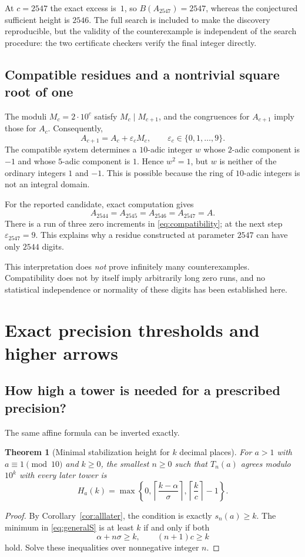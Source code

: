 \documentclass[11pt,a4paper]{article}
\newtheorem{theorem}{Theorem}[section]
\theoremstyle{definition}
\theoremstyle{remark}
\newcommand{\ceil}[1]{\left\lceil #1\right\rceil}
\begin{document}
At $c=2547$ the exact excess is~$1$, so $B(A_{2547})=2547$, whereas the conjectured sufficient height is $2546$. The full search is included to make the discovery reproducible, but the validity of the counterexample is independent of the search procedure: the two certificate checkers verify the final integer directly.

\subsection{Compatible residues and a nontrivial square root of one}
The moduli $M_c=2\cdot10^c$ satisfy $M_c\mid M_{c+1}$, and the congruences for $A_{c+1}$ imply those for $A_c$. Consequently,
\begin{equation}\label{eq:compatibility}
 A_{c+1}=A_c+\varepsilon_c M_c,
 \qquad\varepsilon_c\in\{0,1,\ldots,9\}.
\end{equation}
The compatible system determines a $10$-adic integer $w$ whose $2$-adic component is $-1$ and whose $5$-adic component is $1$. Hence $w^2=1$, but $w$ is neither of the ordinary integers $1$ and $-1$. This is possible because the ring of $10$-adic integers is not an integral domain.

For the reported candidate, exact computation gives
\[
 A_{2544}=A_{2545}=A_{2546}=A_{2547}=A.
\]
There is a run of three zero increments in \eqref{eq:compatibility}; at the next step $\varepsilon_{2547}=9$. This explains why a residue constructed at parameter $2547$ can have only $2544$ digits.

This interpretation does \emph{not} prove infinitely many counterexamples. Compatibility does not by itself imply arbitrarily long zero runs, and no statistical independence or normality of these digits has been established here.

\section{Exact precision thresholds and higher arrows}
\label{sec:precision}

\subsection{How high a tower is needed for a prescribed precision?}
The same affine formula can be inverted exactly.

\begin{theorem}[Minimal stabilization height for $k$ decimal places]\label{thm:precision}
For $a>1$ with $a\equiv1\pmod{10}$ and $k\ge0$, the smallest $n\ge0$ such that $T_n(a)$ agrees modulo $10^k$ with every later tower is
\begin{equation}\label{eq:precision}
 H_a(k)=\max\left\{0,
 \ceil{\frac{k-\alpha}{\sigma}},
 \ceil{\frac{k}{c}}-1\right\}.
\end{equation}
\end{theorem}
\begin{proof}
By Corollary~\ref{cor:alllater}, the condition is exactly $s_n(a)\ge k$. The minimum in \eqref{eq:generalS} is at least $k$ if and only if both
\[
 \alpha+n\sigma\ge k,\qquad (n+1)c\ge k
\]
hold. Solve these inequalities over nonnegative integer $n$.
\end{proof}
\end{document}
